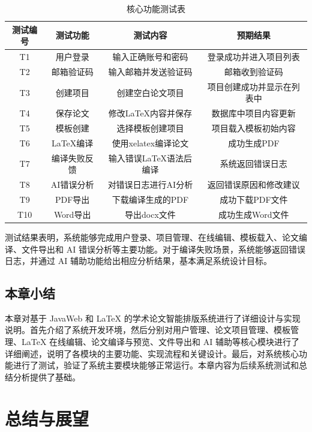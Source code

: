 \documentclass[twoside,openright]{xduugthesis}
\begin{document}
\begin{table}[H]
    \centering
    \caption{核心功能测试表}
    \label{tab:core-function-test}
    \begin{tabular}{|c|c|c|c|}
        \hline
        测试编号 & 测试功能 & 测试内容 & 预期结果 \\
        \hline
        T1 & 用户登录 & 输入正确账号和密码 & 登录成功并进入项目列表 \\
        \hline
        T2 & 邮箱验证码 & 输入邮箱并发送验证码 & 邮箱收到验证码 \\
        \hline
        T3 & 创建项目 & 创建空白论文项目 & 项目创建成功并显示在列表中 \\
        \hline
        T4 & 保存论文 & 修改LaTeX内容并保存 & 数据库中项目内容更新 \\
        \hline
        T5 & 模板创建 & 选择模板创建项目 & 项目载入模板初始内容 \\
        \hline
        T6 & LaTeX编译 & 使用xelatex编译论文 & 成功生成PDF \\
        \hline
        T7 & 编译失败反馈 & 输入错误LaTeX语法后编译 & 系统返回错误日志 \\
        \hline
        T8 & AI错误分析 & 对错误日志进行AI分析 & 返回错误原因和修改建议 \\
        \hline
        T9 & PDF导出 & 下载编译生成的PDF & 成功下载PDF文件 \\
        \hline
        T10 & Word导出 & 导出docx文件 & 成功生成Word文件 \\
        \hline
    \end{tabular}
\end{table}

测试结果表明，系统能够完成用户登录、项目管理、在线编辑、模板载入、论文编译、文件导出和 AI 错误分析等主要功能。对于编译失败场景，系统能够返回错误日志，并通过 AI 辅助功能给出相应分析结果，基本满足系统设计目标。

\section{本章小结}
本章对基于 JavaWeb 和 LaTeX 的学术论文智能排版系统进行了详细设计与实现说明。首先介绍了系统开发环境，然后分别对用户管理、论文项目管理、模板管理、LaTeX 在线编辑、论文编译与预览、文件导出和 AI 辅助等核心模块进行了详细阐述，说明了各模块的主要功能、实现流程和关键设计。最后，对系统核心功能进行了测试，验证了系统主要模块能够正常运行。本章内容为后续系统测试和总结分析提供了基础。

\chapter{总结与展望}
\end{document}
